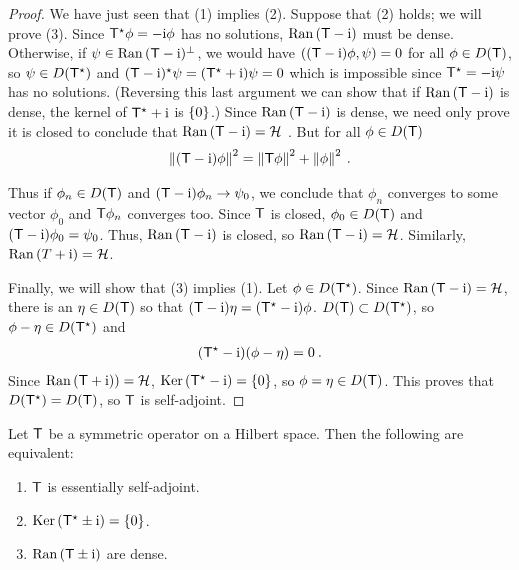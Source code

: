\begin{proof}
We have just seen that (1) implies (2). Suppose that (2) holds; we will
prove (3). Since $\mathsf{T}^\star \phi = -\mathrm{i} \phi$ has no solutions, $\mathrm{Ran}\, (\mathsf{T}- \mathrm{i}) $ must be dense.
Otherwise, if $\psi \in \mathrm{Ran}\, ( \mathsf{T}- \mathrm{i} )^\bot$, we would have $((\mathsf{T}-\mathrm{i}) \phi, \psi) =0$ for all $\phi \in D(\mathsf{T})$, so $\psi \in D(\mathsf{T}^\star)$ and $(\mathsf{T} - \mathrm{i})^\star \psi = (\mathsf{T}^\star + \mathrm{i}) \psi = 0$ which is impossible since $\mathsf{T}^\star = - \mathrm{i} \psi $ has no solutions.
(Reversing this last argument we can show that if $\mathrm{Ran}\, ( \mathsf{T} - \mathrm{i})$ is dense, the kernel of $\mathsf{T}^\star + \mathrm{i} $ is $\left \lbrace 0 \right \rbrace$.) Since $\mathrm{Ran}\, ( \mathsf{T} - \mathrm{i})$  is dense, we need only prove it is closed to conclude that $\mathrm{Ran}\, ( \mathsf{T} - \mathrm{i}) = \mathcal{H}$ . But for all $\phi \in D(\mathsf{T})$
\begin{align}
    \left \Vert (\mathsf{T} - \mathrm{i}) \phi \right \Vert^2 = \left \Vert \mathsf{T} \phi \right \Vert^2 + \left \Vert \phi \right \Vert^2 \:.
\end{align}

Thus if $\phi_n \in D(\mathsf{T})$ and $(\mathsf{T} - \mathrm{i}) \phi_n \rightarrow \psi_0$, we conclude that $\phi_n$ converges to some vector $\phi_0$ and $\mathsf{T} \phi_n$ converges too. Since $\mathsf{T}$ is closed, $\phi_0 \in D(\mathsf{T})$ and $(\mathsf{T} - \mathrm{i}) \phi_0 = \psi_0$. Thus, $\mathrm{Ran}\,(\mathsf{T} - \mathrm{i})$ is closed, so $\mathrm{Ran}\, (\mathsf{T} - \mathrm{i}) = \mathcal{H}$. Similarly, $\mathrm{Ran}\,(T+\mathrm{i}) = \mathcal{H}$.

Finally, we will show that (3) implies (1). Let $\phi \in D(\mathsf{T}^\star)$. Since $\mathrm{Ran}\, (\mathsf{T} -\mathrm{i}) = \mathcal{H}$, there is an $\eta \in D(\mathsf{T})$ so that $(\mathsf{T} - \mathrm{i}) \eta = (\mathsf{T}^\star - \mathrm{i}) \phi$. $D(\mathsf{T}) \subset D(\mathsf{T}^\star)$, so $\phi - \eta \in D(\mathsf{T}^\star)$ and \begin{align}
    (\mathsf{T}^\star - \mathrm{i})(\phi - \eta) = 0 \:.
\end{align}
Since $\mathrm{Ran}\,(\mathsf{T} +\mathrm{i}) )=\mathcal{H}$, $\mathrm{Ker}\, (\mathsf{T}^\star - \mathrm{i}) = \left \lbrace 0 \right \rbrace$, so $\phi = \eta \in D(\mathsf{T})$. This proves that $D(\mathsf{T}^\star) = D(\mathsf{T})$, so $\mathsf{T}$ is self-adjoint.

\end{proof}

\begin{corollary}
    Let $\mathsf{T}$ be a symmetric operator on a Hilbert space. Then the following are equivalent:
    \begin{enumerate}
        \item $\mathsf{T}$ is essentially self-adjoint.
        \item $\mathrm{Ker}\, (\mathsf{T}^\star \pm \mathrm{i}) = \left \lbrace 0 \right \rbrace$.
        \item $\mathrm{Ran}\,(\mathsf{T} \pm \mathrm{i})$ are dense.
    \end{enumerate}
\end{corollary}

